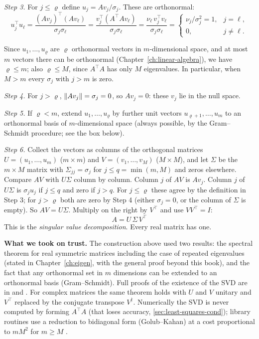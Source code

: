\emph{Step 3.} For $j\le\varrho$ define $u_j = Av_j/\sigma_j$. These are orthonormal:
\[
u_j^\top u_\ell = \frac{(Av_j)^\top (Av_\ell)}{\sigma_j\sigma_\ell} = \frac{v_j^\top (A^\top A v_\ell)}{\sigma_j\sigma_\ell} = \frac{\nu_\ell\, v_j^\top v_\ell}{\sigma_j\sigma_\ell} = \begin{cases}\nu_j/\sigma_j^2 = 1, & j=\ell,\\ 0, & j\neq \ell.\end{cases}
\]

Since $u_1,\dots,u_\varrho$ are $\varrho$ orthonormal vectors in $m$-dimensional space, and at most $m$ vectors there can be orthonormal (Chapter~\ref{ch:linear-algebra}), we have $\varrho\le m$; also $\varrho\le M$, since $A^\top A$ has only $M$ eigenvalues. In particular, when $M>m$ every $\sigma_j$ with $j>m$ is zero.

\emph{Step 4.} For $j>\varrho$, $\left\lVert Av_j\right\rVert = \sigma_j = 0$, so $Av_j = 0$: these $v_j$ lie in the null space.

\emph{Step 5.} If $\varrho < m$, extend $u_1,\dots,u_\varrho$ by further unit vectors $u_{\varrho+1},\dots,u_m$ to an orthonormal basis of $m$-dimensional space (always possible, by the Gram--Schmidt procedure; see the box below).

\emph{Step 6.} Collect the vectors as columns of the orthogonal matrices $U = (u_1,\dots,u_m)$ ($m\times m$) and $V = (v_1,\dots,v_M)$ ($M\times M$), and let $\Sigma$ be the $m\times M$ matrix with $\Sigma_{jj} = \sigma_j$ for $j\le q = \min(m,M)$ and zeros elsewhere. Compare $AV$ with $U\Sigma$ column by column. Column $j$ of $AV$ is $Av_j$. Column $j$ of $U\Sigma$ is $\sigma_j u_j$ if $j\le q$ and zero if $j>q$. For $j\le\varrho$ these agree by the definition in Step 3; for $j>\varrho$ both are zero by Step 4 (either $\sigma_j=0$, or the column of $\Sigma$ is empty). So $AV = U\Sigma$. Multiply on the right by $V^\top$ and use $VV^\top = I$:
\begin{equation}
\boxed{\,A = U\,\Sigma\,V^\top\,}
\label{eq:least-squares-svd}
\end{equation}
This is the \emph{singular value decomposition}. Every real matrix has one.

\begin{beyond}
\textbf{What we took on trust.} The construction above used two results: the spectral theorem for real symmetric matrices including the case of repeated eigenvalues (stated in Chapter~\ref{ch:eigen}, with the general proof beyond this book), and the fact that any orthonormal set in $m$ dimensions can be extended to an orthonormal basis (Gram--Schmidt). Full proofs of the existence of the SVD are in \cite{strang} and \cite{trefethen}. For complex matrices the same theorem holds with $U$ and $V$ unitary and $V^\top$ replaced by the conjugate transpose $V^\dagger$. Numerically the SVD is never computed by forming $A^\top A$ (that loses accuracy, \cref{sec:least-squares-cond}); library routines use a reduction to bidiagonal form (Golub--Kahan) at a cost proportional to $mM^2$ for $m\ge M$ \cite{trefethen,nr}.
\end{beyond}

